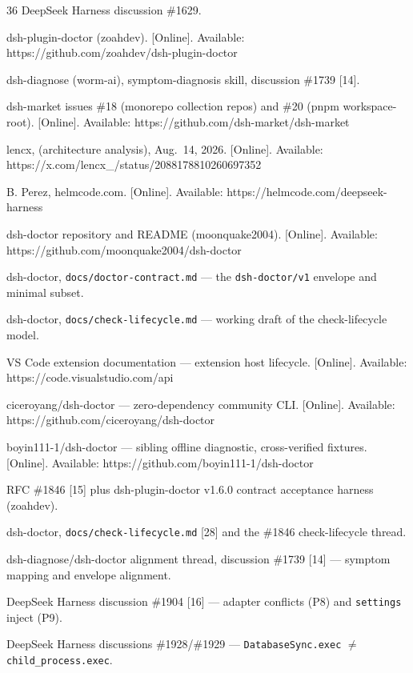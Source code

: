 \documentclass[11pt]{article}
\begin{document}
\begin{thebibliography}{36}
 DeepSeek Harness discussion
\#1629.

 dsh-plugin-doctor (zoahdev). [Online]. Available:
https://github.com/zoahdev/dsh-plugin-doctor

 dsh-diagnose (worm-ai), symptom-diagnosis skill, discussion
\#1739 [14].

 dsh-market issues \#18 (monorepo collection repos) and \#20
(pnpm workspace-root). [Online]. Available:
https://github.com/dsh-market/dsh-market

 lencx,  (architecture analysis),
Aug.~14, 2026. [Online]. Available:
https://x.com/lencx\_/status/2088178810260697352

 B. Perez,  helmcode.com.
[Online]. Available: https://helmcode.com/deepseek-harness

 dsh-doctor repository and README (moonquake2004). [Online].
Available: https://github.com/moonquake2004/dsh-doctor

 dsh-doctor, \texttt{docs/doctor-contract.md} --- the
\texttt{dsh-doctor/v1} envelope and minimal subset.

 dsh-doctor, \texttt{docs/check-lifecycle.md} --- working draft
of the check-lifecycle model.

 VS Code extension documentation --- extension host lifecycle.
[Online]. Available: https://code.visualstudio.com/api

 ciceroyang/dsh-doctor --- zero-dependency community CLI.
[Online]. Available: https://github.com/ciceroyang/dsh-doctor

 boyin111-1/dsh-doctor --- sibling offline diagnostic,
cross-verified fixtures. [Online]. Available:
https://github.com/boyin111-1/dsh-doctor

 RFC \#1846 [15] plus dsh-plugin-doctor v1.6.0 contract
acceptance harness (zoahdev).

 dsh-doctor, \texttt{docs/check-lifecycle.md} [28] and the
\#1846 check-lifecycle thread.

 dsh-diagnose/dsh-doctor alignment thread, discussion \#1739
[14] --- symptom mapping and envelope alignment.

 DeepSeek Harness discussion \#1904 [16] --- adapter
conflicts (P8) and \texttt{settings} inject (P9).

 DeepSeek Harness discussions \#1928/\#1929 ---
\texttt{DatabaseSync.exec}  $\neq$  \texttt{child\_process.exec}.

\end{thebibliography}
\end{document}
